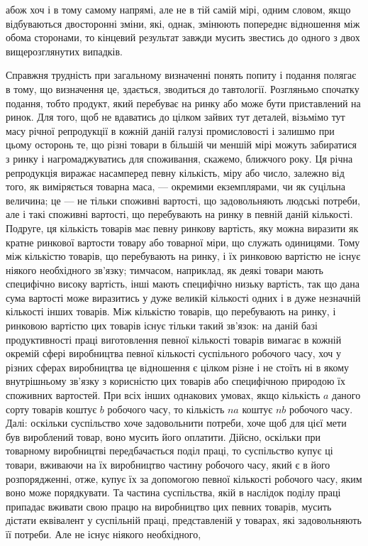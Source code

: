 \parcont{}  %
абож хоч і в тому самому напрямі, але не в тій самій мірі,
одним словом, якщо відбуваються двосторонні зміни, які, однак,
змінюють попереднє відношення між обома сторонами, то кінцевий
результат завжди мусить звестись до одного з двох
вищерозглянутих випадків.

Справжня трудність при загальному визначенні понять попиту
і подання полягає в тому, що визначення це, здається, зводиться
до тавтології. Розгляньмо спочатку подання, тобто продукт,
який перебуває на ринку або може бути приставлений на
ринок. Для того, щоб не вдаватись до цілком зайвих тут
деталей, візьмімо тут масу річної репродукції в кожній даній
галузі промисловості і залишмо при цьому осторонь те, що різні
товари в більшій чи меншій мірі можуть забиратися з ринку
і нагромаджуватись для споживання, скажемо, ближчого року.
Ця річна репродукція виражає насамперед певну кількість, міру
або число, залежно від того, як виміряється товарна маса, —
окремими екземплярами, чи як суцільна величина; це — не тільки
споживні вартості, що задовольняють людські потреби, але і такі
споживні вартості, що перебувають на ринку в певній даній
кількості. Подруге, ця кількість товарів має певну ринкову
вартість, яку можна виразити як кратне ринкової вартости товару
або товарної міри, що служать одиницями. Тому між
кількістю товарів, що перебувають на ринку, і їх ринковою
вартістю не існує ніякого необхідного зв’язку; тимчасом, наприклад,
як деякі товари мають специфічно високу вартість,
інші мають специфічно низьку вартість, так що дана сума вартості
може виразитись у дуже великій кількості одних і в дуже
незначній кількості інших товарів. Між кількістю товарів, що
перебувають на ринку, і ринковою вартістю цих товарів існує
тільки такий зв’язок: на даній базі продуктивності праці виготовлення
певної кількості товарів вимагає в кожній окремій
сфері виробництва певної кількості суспільного робочого часу,
хоч у різних сферах виробництва це відношення є цілком різне
і не стоїть ні в якому внутрішньому зв’язку з корисністю цих
товарів або специфічною природою їх споживних вартостей.
При всіх інших однакових умовах, якщо кількість $a$ даного
сорту товарів коштує $b$ робочого часу, то кількість $na$ коштує
$nb$ робочого часу. Далі: оскільки суспільство хоче задовольнити
потреби, хоче щоб для цієї мети був вироблений товар, воно мусить
його оплатити. Дійсно, оскільки при товарному виробництві
передбачається поділ праці, то суспільство купує ці товари,
вживаючи на їх виробництво частину робочого часу, який
є в його розпорядженні, отже, купує їх за допомогою певної
кількості робочого часу, яким воно може порядкувати. Та частина
суспільства, якій в наслідок поділу праці припадає вживати
свою працю на виробництво цих певних товарів, мусить
дістати еквівалент у суспільній праці, представленій у товарах,
які задовольняють її потреби. Але не існує ніякого необхідного,
\parbreak{}  %
